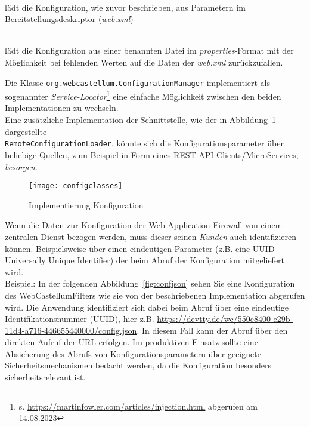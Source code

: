 \begin{description}
  \small
\item[DefaultConfigurationLoader] \hfill \\
  lädt die Konfiguration, wie zuvor beschrieben, aus Parametern im Bereitstellungsdeskriptor (\emph{web.xml})
\item[PropertiesFileConfigurationLoader] \hfill \\
  lädt die Konfiguration aus einer benannten Datei im \emph{properties}-Format mit der Möglichkeit bei fehlenden Werten auf die Daten der \emph{web.xml} zurückzufallen.
\end{description}

Die Klasse \verb=org.webcastellum.ConfigurationManager= implementiert als sogenannter \emph{Service-Locator}\footnote{s. \url{https://martinfowler.com/articles/injection.html} abgerufen am 14.08.2023} eine einfache Möglichkeit zwischen den beiden Implementationen zu wechseln.\\

Eine zusätzliche Implementation der Schnittstelle, wie der in Abbildung~\ref{fig.impkonfig} dargestellte\\ \verb=RemoteConfigurationLoader=, könnte sich die Konfigurationsparameter über beliebige Quellen, zum Beispiel in Form eines REST-API-Clients/MicroServices, \glqq\emph{besorgen}\grqq. 

\begin{figure}[h]
  \begin{center}
    \texttt{[image: configclasses]}
    \caption{Implementierung Konfiguration}
    \label{fig.impkonfig}
  \end{center}
\end{figure}

Wenn die Daten zur Konfiguration der Web Application Firewall von einem zentralen Dienst bezogen werden, muss dieser seinen \emph{Kunden} auch identifizieren können. Beispielsweise über einen eindeutigen Parameter (z.B. eine UUID - Universally Unique Identifier) der beim Abruf der Konfiguration mitgeliefert wird. \\

\textcolor{bhtGray}{ Beispiel:} In der folgenden Abbildung~\ref{fig:confjson} sehen Sie eine Konfiguration des WebCastellumFilters wie sie von der beschriebenen Implementation abgerufen wird. Die Anwendung identifiziert sich dabei beim Abruf über eine eindeutige Identifikationsnummer (UUID), hier z.B. \url{https://devtty.de/wc/550e8400-e29b-11d4-a716-446655440000/config.json}. In diesem Fall kann der Abruf über den direkten Aufruf der URL erfolgen. Im produktiven Einsatz sollte eine Absicherung des Abrufs von Konfigurationsparametern über geeignete Sicherheitsmechanismen bedacht werden, da die Konfiguration besonders sicherheitsrelevant ist.\\

